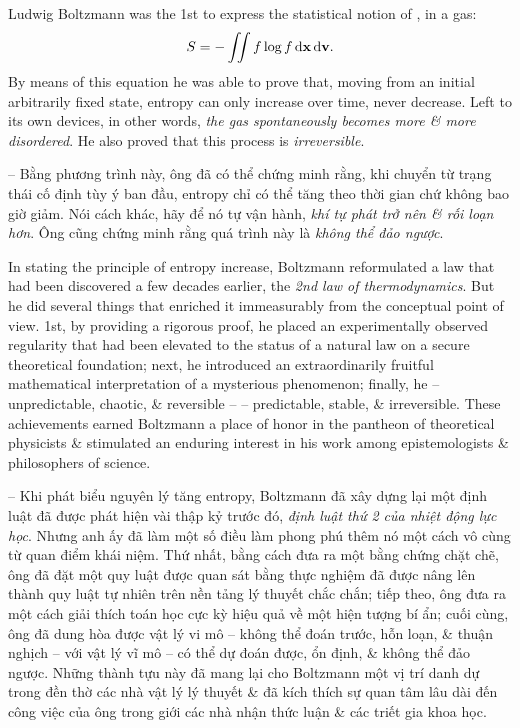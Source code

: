 \documentclass{article}
\begin{document}
\begin{enumerate}
	Ludwig Boltzmann was the 1st to express the statistical notion of , in a gas:
	\begin{equation*}
		S = -\iint f\log f\,{\rm d}{\bf x}\,{\rm d}{\bf v}.
	\end{equation*}
	By means of this equation he was able to prove that, moving from an initial arbitrarily fixed state, entropy can only increase over time, never decrease. Left to its own devices, in other words, {\it the gas spontaneously becomes more \& more disordered}. He also proved that this process is {\it irreversible}.
	
	-- Bằng phương trình này, ông đã có thể chứng minh rằng, khi chuyển từ trạng thái cố định tùy ý ban đầu, entropy chỉ có thể tăng theo thời gian chứ không bao giờ giảm. Nói cách khác, hãy để nó tự vận hành, {\it khí tự phát trở nên \& rối loạn hơn}. Ông cũng chứng minh rằng quá trình này là {\it không thể đảo ngược}.
	
	In stating the principle of entropy increase, Boltzmann reformulated a law that had been discovered a few decades earlier, the {\it 2nd law of thermodynamics}. But he did several things that enriched it immeasurably from the conceptual point of view. 1st, by providing a rigorous proof, he placed an experimentally observed regularity that had been elevated to the status of a natural law on a secure theoretical foundation; next, he introduced an extraordinarily fruitful mathematical interpretation of a mysterious phenomenon; finally, he  -- unpredictable, chaotic, \& reversible --  -- predictable, stable, \& irreversible. These achievements earned Boltzmann a place of honor in the pantheon of theoretical physicists \& stimulated an enduring interest in his work among epistemologists \& philosophers of science.
	
	-- Khi phát biểu nguyên lý tăng entropy, Boltzmann đã xây dựng lại một định luật đã được phát hiện vài thập kỷ trước đó, {\it định luật thứ 2 của nhiệt động lực học}. Nhưng anh ấy đã làm một số điều làm phong phú thêm nó một cách vô cùng từ quan điểm khái niệm. Thứ nhất, bằng cách đưa ra một bằng chứng chặt chẽ, ông đã đặt một quy luật được quan sát bằng thực nghiệm đã được nâng lên thành quy luật tự nhiên trên nền tảng lý thuyết chắc chắn; tiếp theo, ông đưa ra một cách giải thích toán học cực kỳ hiệu quả về một hiện tượng bí ẩn; cuối cùng, ông đã dung hòa được vật lý vi mô -- không thể đoán trước, hỗn loạn, \& thuận nghịch -- với vật lý vĩ mô -- có thể dự đoán được, ổn định, \& không thể đảo ngược. Những thành tựu này đã mang lại cho Boltzmann một vị trí danh dự trong đền thờ các nhà vật lý lý thuyết \& đã kích thích sự quan tâm lâu dài đến công việc của ông trong giới các nhà nhận thức luận \& các triết gia khoa học.
	

\end{enumerate}
\end{document}
